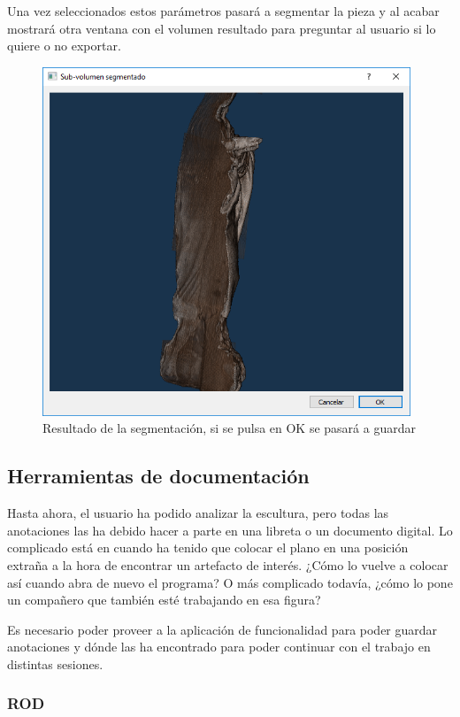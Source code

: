 Una vez seleccionados estos parámetros pasará a segmentar la pieza y al acabar mostrará otra ventana con el volumen resultado para preguntar al usuario si lo quiere o no exportar.

\begin{figure}[H]
	\centering
	\includegraphics[width=11cm]{imagenes/desarrollo/gui-segmentacion-resultado}
	\caption{Resultado de la segmentación, si se pulsa en OK se pasará a guardar}
	\label{fig:desarrollo/gui-segmentacion-resultado}
\end{figure}

\subsection{Herramientas de documentación}

Hasta ahora, el usuario ha podido analizar la escultura, pero todas las anotaciones las ha debido hacer a parte en una libreta o un documento digital. Lo complicado está en cuando ha tenido que colocar el plano en una posición extraña a la hora de encontrar un artefacto de interés. ¿Cómo lo vuelve a colocar así cuando abra de nuevo el programa? O más complicado todavía, ¿cómo lo pone un compañero que también esté trabajando en esa figura?

Es necesario poder proveer a la aplicación de funcionalidad para poder guardar anotaciones y dónde las ha encontrado para poder continuar con el trabajo en distintas sesiones.

\subsubsection{ROD}

